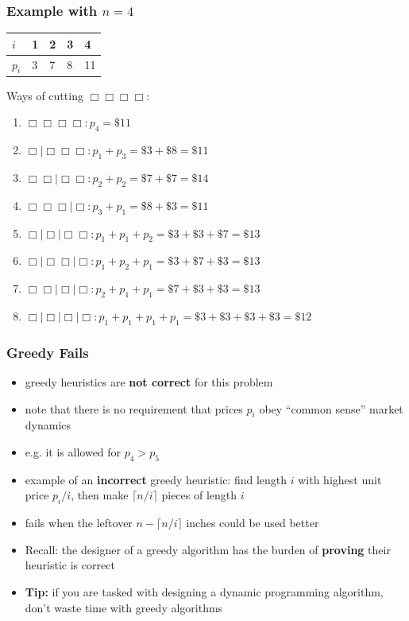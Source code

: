 \documentclass{beamer}
\begin{document}
\begin{frame} \frametitle{Example with $n=4$}
\begin{center}
  \begin{tabular}{|l|l|l|l|l|} \hline
    $i$ & 1 & 2 & 3 & 4 \\ \hline
    $p_i$ & 3 & 7 & 8 & 11 \\ \hline
  \end{tabular}
\end{center}

Ways of cutting $\Box\Box\Box\Box$:
\begin{enumerate}
  \item $\Box\Box\Box\Box : p_4 = \$ 11$
  \item $\Box \mid \Box\Box\Box : p_1 + p_3 = \$3 + \$8 = \$11$
  \item $\Box\Box \mid \Box\Box : p_2 + p_2 = \$7 + \$7 = \$14$
  \item $\Box\Box\Box \mid \Box : p_3 + p_1 = \$8 + \$3 = \$11$
  \item $\Box \mid \Box \mid \Box\Box : p_1 + p_1 + p_2 = \$3 + \$3 + \$7 = \$13$
  \item $\Box \mid \Box\Box \mid \Box : p_1 + p_2 + p_1 = \$3 + \$7 + \$3 = \$13$
  \item $\Box\Box \mid \Box \mid \Box : p_2 + p_1 + p_1 = \$7 + \$3 + \$3 = \$13$
  \item $\Box \mid \Box \mid \Box \mid \Box : p_1 + p_1 + p_1 + p_1 = \$3 + \$3 + \$3 + \$3 = \$12$
\end{enumerate}

\end{frame}

\begin{frame} \frametitle{Greedy Fails}
\begin{itemize}
  \item greedy heuristics are \textbf{not correct} for this problem
  \item note that there is no requirement that prices $p_i$ obey ``common sense'' market dynamics
  \item e.g. it is allowed for $p_4 > p_5$
  \item example of an \textbf{incorrect} greedy heuristic: find length $i$ with highest unit price $p_i/i$, then make $\lceil n/i \rceil$ pieces of length $i$
  \item fails when the leftover $n-\lceil n/i \rceil$ inches could be used better
  \item Recall: the designer of a greedy algorithm has the burden of \textbf{proving} their heuristic is correct
  \item \textbf{Tip:} if you are tasked with designing a dynamic programming algorithm, don't waste time with greedy algorithms
\end{itemize}
\end{frame}
\end{document}
